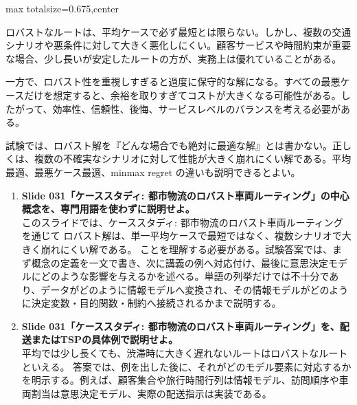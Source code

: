 \begin{adjustbox}{max totalsize={\textwidth}{0.675\textheight},center}
\begin{minipage}{\textwidth}
\begin{minipage}[t]{0.485\textwidth}
ロバストなルートは、平均ケースで必ず最短とは限らない。しかし、複数の交通シナリオや悪条件に対して大きく悪化しにくい。顧客サービスや時間約束が重要な場合、少し長いが安定したルートの方が、実務上は優れていることがある。\par
一方で、ロバスト性を重視しすぎると過度に保守的な解になる。すべての最悪ケースだけを想定すると、余裕を取りすぎてコストが大きくなる可能性がある。したがって、効率性、信頼性、後悔、サービスレベルのバランスを考える必要がある。\par
試験では、ロバスト解を『どんな場合でも絶対に最適な解』とは書かない。正しくは、複数の不確実なシナリオに対して性能が大きく崩れにくい解である。平均最適、最悪ケース最適、minmax regret の違いも説明できるとよい。\par
{}
\begin{enumerate}
\item \textbf{Slide 031「ケーススタディ: 都市物流のロバスト車両ルーティング」の中心概念を、専門用語を使わずに説明せよ。}\\このスライドでは、ケーススタディ: 都市物流のロバスト車両ルーティング を通じて ロバスト解は、単一平均ケースで最短ではなく、複数シナリオで大きく崩れにくい解である。 ことを理解する必要がある。試験答案では、まず概念の定義を一文で書き、次に講義の例へ対応付け、最後に意思決定モデルにどのような影響を与えるかを述べる。単語の列挙だけでは不十分であり、データがどのように情報モデルへ変換され、その情報モデルがどのように決定変数・目的関数・制約へ接続されるかまで説明する。
\item \textbf{Slide 031「ケーススタディ: 都市物流のロバスト車両ルーティング」を、配送またはTSPの具体例で説明せよ。}\\平均では少し長くても、渋滞時に大きく遅れないルートはロバストなルートといえる。 答案では、例を出した後に、それがどのモデル要素に対応するかを明示する。例えば、顧客集合や旅行時間行列は情報モデル、訪問順序や車両割当は意思決定モデル、実際の配送指示は実装である。
\end{enumerate}
\end{minipage}
\end{minipage}
\end{adjustbox}

